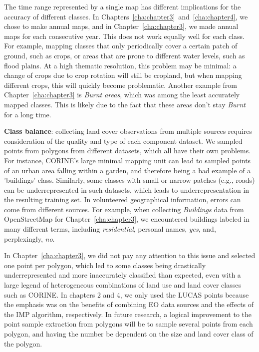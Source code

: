             The time range represented by a single map has different implications for the accuracy of different classes. In Chapters\@~\ref{cha:chapter3}\@~and\@~\ref{cha:chapter4}, we chose to make annual maps, and in Chapter\@~\ref{cha:chapter3}, we made annual maps for each consecutive year. This does not work equally well for each class. For example, mapping classes that only periodically cover a certain patch of ground, such as crops, or areas that are prone to different water levels, such as flood plains. At a high thematic resolution, this problem may be minimal: a change of crops due to crop rotation will still be cropland, but when mapping different crops, this will quickly become problematic. Another example from Chapter\@~\ref{cha:chapter3} is \textit{Burnt areas}, which was among the least accurately mapped classes. This is likely due to the fact that these areas don't stay \textit{Burnt} for a long time.

            \textbf{Class balance}: collecting land cover observations from multiple sources requires consideration of the quality and type of each component dataset. We sampled points from polygons from different datasets, which all have their own problems. For instance, CORINE's large minimal mapping unit can lead to sampled points of an urban area falling within a garden, and therefore being a bad example of a 'buildings' class. Similarly, some classes with small or narrow patches (e.g., roads) can be underrepresented in such datasets, which leads to underrepresentation in the resulting training set. In volunteered geographical information, errors can come from different sources.
            For example, when collecting \textit{Buildings} data from OpenStreetMap for Chapter\@~\ref{cha:chapter3}, we encountered buildings labeled in many different terms, including \textit{residential}, personal names, \textit{yes}, and, perplexingly, \textit{no}.

            In Chapter\@~\ref{cha:chapter3}, we did not pay any attention to this issue and selected one point per polygon, which led to some classes being drastically underrepresented and more inaccurately classified than expected, even with a large legend of heterogeneous combinations of land use and land cover classes such as CORINE. In chapters 2 and 4, we only used the LUCAS points because the emphasis was on the benefits of combining EO data sources and the effects of the IMP algorithm, respectively. In future research, a logical improvement to the point sample extraction from polygons will be to sample several points from each polygon, and having the number be dependent on the size and land cover class of the polygon.

